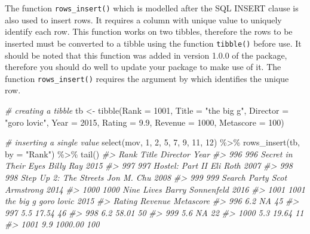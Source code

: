 \documentclass[
]{book}
\newenvironment{Shaded}{\begin{snugshade}}{\end{snugshade}}
\newcommand{\AttributeTok}[1]{\textcolor[rgb]{0.77,0.63,0.00}{#1}}
\newcommand{\CommentTok}[1]{\textcolor[rgb]{0.56,0.35,0.01}{\textit{#1}}}
\newcommand{\DecValTok}[1]{\textcolor[rgb]{0.00,0.00,0.81}{#1}}
\newcommand{\FloatTok}[1]{\textcolor[rgb]{0.00,0.00,0.81}{#1}}
\newcommand{\FunctionTok}[1]{\textcolor[rgb]{0.00,0.00,0.00}{#1}}
\newcommand{\NormalTok}[1]{#1}
\newcommand{\OtherTok}[1]{\textcolor[rgb]{0.56,0.35,0.01}{#1}}
\newcommand{\SpecialCharTok}[1]{\textcolor[rgb]{0.00,0.00,0.00}{#1}}
\newcommand{\StringTok}[1]{\textcolor[rgb]{0.31,0.60,0.02}{#1}}
\begin{document}
The function \texttt{rows\_insert()} which is modelled after the SQL INSERT clause is also used to insert rows. It requires a column with unique value to uniquely identify each row. This function works on two tibbles, therefore the rows to be inserted must be converted to a tibble using the function \texttt{tibble()} before use.
It should be noted that this function was added in version 1.0.0 of the package, therefore you should do well to update your package to make use of it.
The function \texttt{rows\_insert()} requires the argument by which identifies the unique row.

\begin{Shaded}
\begin{Highlighting}[]
\CommentTok{\# creating a tibble}
\NormalTok{tb }\OtherTok{\textless{}{-}} 
  \FunctionTok{tibble}\NormalTok{(}\AttributeTok{Rank =} \DecValTok{1001}\NormalTok{, }
         \AttributeTok{Title =} \StringTok{"the big g"}\NormalTok{, }
         \AttributeTok{Director =} \StringTok{"goro lovic"}\NormalTok{, }
         \AttributeTok{Year =} \DecValTok{2015}\NormalTok{, }
         \AttributeTok{Rating =} \FloatTok{9.9}\NormalTok{, }
         \AttributeTok{Revenue =} \DecValTok{1000}\NormalTok{, }
         \AttributeTok{Metascore =} \DecValTok{100}\NormalTok{)}
         
\CommentTok{\# inserting a single value}
\FunctionTok{select}\NormalTok{(mov, }\DecValTok{1}\NormalTok{, }\DecValTok{2}\NormalTok{, }\DecValTok{5}\NormalTok{, }\DecValTok{7}\NormalTok{, }\DecValTok{9}\NormalTok{, }\DecValTok{11}\NormalTok{, }\DecValTok{12}\NormalTok{) }\SpecialCharTok{\%\textgreater{}\%}
  \FunctionTok{rows\_insert}\NormalTok{(tb, }\AttributeTok{by =} \StringTok{"Rank"}\NormalTok{) }\SpecialCharTok{\%\textgreater{}\%}
  \FunctionTok{tail}\NormalTok{()}
\CommentTok{\#\textgreater{}      Rank                  Title         Director Year}
\CommentTok{\#\textgreater{} 996   996   Secret in Their Eyes        Billy Ray 2015}
\CommentTok{\#\textgreater{} 997   997        Hostel: Part II         Eli Roth 2007}
\CommentTok{\#\textgreater{} 998   998 Step Up 2: The Streets       Jon M. Chu 2008}
\CommentTok{\#\textgreater{} 999   999           Search Party   Scot Armstrong 2014}
\CommentTok{\#\textgreater{} 1000 1000             Nine Lives Barry Sonnenfeld 2016}
\CommentTok{\#\textgreater{} 1001 1001              the big g       goro lovic 2015}
\CommentTok{\#\textgreater{}      Rating Revenue Metascore}
\CommentTok{\#\textgreater{} 996     6.2      NA        45}
\CommentTok{\#\textgreater{} 997     5.5   17.54        46}
\CommentTok{\#\textgreater{} 998     6.2   58.01        50}
\CommentTok{\#\textgreater{} 999     5.6      NA        22}
\CommentTok{\#\textgreater{} 1000    5.3   19.64        11}
\CommentTok{\#\textgreater{} 1001    9.9 1000.00       100}


\end{Highlighting}
\end{Shaded}
\end{document}
